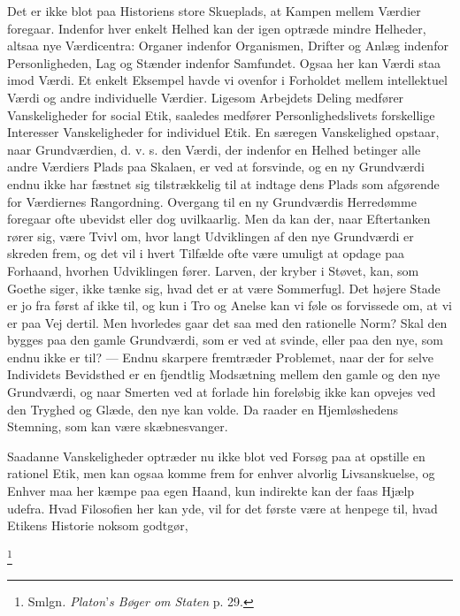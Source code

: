 \documentclass[12pt]{article}
\newcommand{\apage}[1]{\marginnote{\footnotesize\textit{[#1]}}}
\begin{document}
Det er ikke blot paa Historiens store Skueplads, at Kampen mellem Værdier
foregaar. Indenfor hver enkelt Helhed kan der igen optræde mindre Helheder,
altsaa nye Værdicentra: Organer indenfor Organismen, Drifter og Anlæg indenfor
Personligheden, Lag og Stænder indenfor Samfundet. Ogsaa her kan Værdi staa
imod Værdi. Et enkelt Eksempel havde vi ovenfor i Forholdet mellem intellektuel
Værdi og andre individuelle Værdier. Ligesom Arbejdets Deling medfører
Vanskeligheder for social Etik, saaledes medfører Personlighedslivets
forskellige Interesser Vanskeligheder for individuel Etik. En særegen
Vanskelighed opstaar, naar Grundværdien, d. v. s. den Værdi, der indenfor en
Helhed betinger alle andre Værdiers Plads paa Skalaen, er ved at forsvinde, og
en ny Grundværdi endnu ikke har fæstnet sig tilstrækkelig til at indtage dens
Plads som afgørende for Værdiernes Rangordning. Overgang til en ny Grundværdis
Herredømme foregaar ofte ubevidst eller dog uvilkaarlig. Men da kan der, naar
Eftertanken rører sig, være Tvivl om, hvor langt Udviklingen af den nye
Grundværdi er skreden frem, og det vil i hvert Tilfælde ofte være umuligt at
opdage paa Forhaand, hvorhen Udviklingen fører. Larven, der kryber i Støvet,
kan, som Goethe siger, ikke tænke sig, hvad det er at være Sommerfugl. Det
højere Stade er jo fra først af ikke til, og kun i Tro og Anelse kan vi føle os
forvissede om, at vi er paa Vej dertil. Men hvorledes gaar det saa med den
rationelle Norm? Skal den bygges paa den gamle Grundværdi, som er ved at
svinde, eller paa den nye, som endnu ikke er til? --- Endnu skarpere fremtræder
Problemet, naar der for selve Individets Bevidsthed er en fjendtlig Modsætning
\setcounter{footnote}{0}%
\apage{79}mellem den gamle og den nye Grundværdi, og naar Smerten ved at
forlade hin foreløbig ikke kan opvejes ved den Tryghed og Glæde, den nye kan
volde. Da raader en Hjemløshedens Stemning, som kan være skæbnesvanger.

Saadanne Vanskeligheder optræder nu ikke blot ved Forsøg paa at opstille en
rationel Etik, men kan ogsaa komme frem for enhver alvorlig Livsanskuelse, og
Enhver maa her kæmpe paa egen Haand, kun indirekte kan der faas Hjælp udefra.
Hvad Filosofien her kan yde, vil for det første være at henpege til, hvad
Etikens Historie noksom godtgør,

         \footnote{Smlgn\textit{. Platon}'\textit{s Bøger om Staten }p. 29.}
\end{document}
